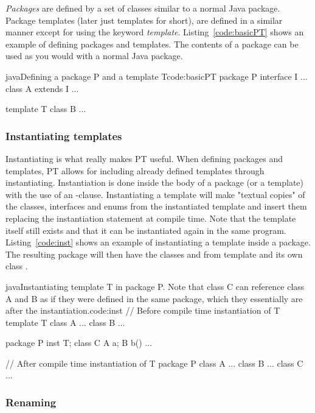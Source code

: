 \emph{Packages} are defined by a set of classes similar to a normal Java package.
Package templates (later just templates for short), are defined in a similar manner except for using the keyword \emph{template}.
Listing~\vref{code:basicPT} shows an example of defining packages and templates.
The contents of a package can be used as you would with a normal Java package.

\begin{code}{java}{Defining a package P and a template T}{code:basicPT}
    package P {
        interface I { ... }
        class A extends I { ... }
    }

    template T {
        class B { ... }
    }
\end{code}

\subsubsection{Instantiating templates}\label{subsubsec:inst}
Instantiating is what really makes PT useful.
When defining packages and templates, PT allows for including already defined templates through instantiating.
Instantiation is done inside the body of a package (or a template) with the use of an -clause.
Instantiating a template will make "textual copies" of the  classes, interfaces and enums from the instantiated template and insert them replacing the instantiation statement at compile time.
Note that the template itself still exists and that it can be instantiated again in the same program.
Listing~\vref{code:inst} shows an example of instantiating a template inside a package.
The resulting package  will then have the classes  and  from template  and its own class .

\begin{code}{java}{Instantiating template T in package P. Note that class C can reference class A and B as if they were defined in the same package, which they essentially are after the instantiation.}{code:inst}
// Before compile time instantiation of T
template T {
    class A { ... }
    class B { ... }
}

package P {
    inst T;
    class C {
        A a;
        B b() {
            ...
        }
    }
}

// After compile time instantiation of T
package P {
    class A { ... }
    class B { ... }
    class C { ... }
}
\end{code}

\subsubsection{Renaming}\label{subsubsec:renaming}

